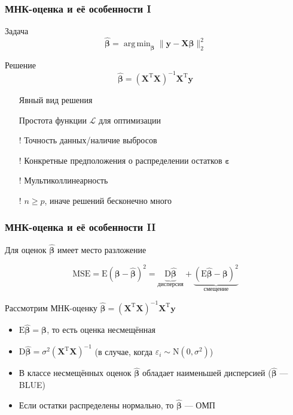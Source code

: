 \documentclass[ucs, notheorems, handout]{beamer}
\DeclareMathOperator*{\argmin}{arg\,min}
\newcommand{\betah}{\hat{\bm \beta}}
\newcommand{\betaa}{\bm{\beta}}
\newcommand{\E}{\mathrm{E}}
\newcommand{\D}{\mathrm{D}}
\newcommand{\XT}{{\bm{X}}^{\mathrm{T}}}
\newcommand{\X}{\bm{X}}
\begin{document}
	\begin{frame}
	    \frametitle{МНК-оценка и её особенности I}
	    \begin{block}{Задача}
	$$\betah = \argmin_{\betaa}{\|\bm y - \bm X \betaa\|^2_2}$$
	\end{block}
	
	\begin{block}{Решение}
	$$\betah = (\X^\mathrm{T}\X)^{-1} \X^\mathrm{T} \bm y$$
	\end{block}	
	
	\begin{itemize}
		\item[\checkmark] Явный вид решения 
		\item[\checkmark] Простота функции $\mathcal L$ для оптимизации
		\item[!] Точность данных/наличие выбросов
		\item[!] Конкретные предположения о распределении остатков $\bm \varepsilon$
		\item[!] Мультиколлинеарность
		\item[!] $n \geqslant p$, иначе решений бесконечно много
	\end{itemize}
	\end{frame}
	
	\begin{frame}
	     \frametitle{МНК-оценка и её особенности II}
	 Для оценок $\betah$ имеет место разложение     \begin{block}{}
	$$\mathrm{MSE} = \E(\betaa - \betah)^2 = \underbrace{\mathrm D \betah}_{\text{дисперсия}} + \underbrace{(\mathrm E \betah - \betaa)^2}_{\text{смещение}}$$
	\end{block}
	
	Рассмотрим МНК-оценку $\betah = (\X^\mathrm{T}\X)^{-1} \X^\mathrm{T} \bm y$
	    
	\begin{itemize}
		\item $\E \betah = \betaa$, то есть оценка несмещённая
		\item $\D \betah = \sigma^2 (\XT\X)^{-1}$ (в случае, когда $\varepsilon_i \sim \mathrm N(0, \sigma^2)$)
		\item В классе несмещённых оценок $\betah$ обладает наименьшей дисперсией ($\betah$ --- BLUE)
		\item Если остатки распределены нормально, то $\betah$ --- ОМП
	 \end{itemize}
	
	
	    \note{
	
	    }
	\end{frame}
	
\end{document}
